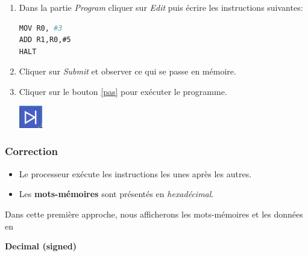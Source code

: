 \documentclass[svgnames,11pt]{beamer}
\begin{document}
\begin{frame}[fragile]
    \frametitle{}

    \begin{activite}
        \begin{enumerate}
            \item Dans la partie \emph{Program} cliquer sur \emph{Edit} puis écrire les instructions suivantes:
                  \begin{center}
                      \begin{lstlisting}[language=Bash , basicstyle=\small, xleftmargin=2em, xrightmargin=2em]
MOV R0, #3
ADD R1,R0,#5
HALT
\end{lstlisting}
                  \end{center}
            \item Cliquer sur \emph{Submit} et observer ce qui se passe en mémoire.
            \item Cliquer sur le bouton \ref{pas} pour exécuter le programme.
                  \begin{center}
                      \centering
                      \includegraphics[width=1cm]{ressources/pasapas.png}
                      \label{pas}
                  \end{center}
        \end{enumerate}
    \end{activite}

\end{frame}
\begin{frame}
    \frametitle{Correction}

    \begin{itemize}
        \item Le processeur exécute les instructions les unes après les autres.
        \item Les \textbf{mots-mémoires} sont présentés en \emph{hexadécimal}.
    \end{itemize}
    \begin{aretenir}[Commentaire]
        Dans cette première approche, nous afficherons les mots-mémoires et les données en

        \centering \textbf{Decimal (signed)}
    \end{aretenir}
\end{frame}
\end{document}
